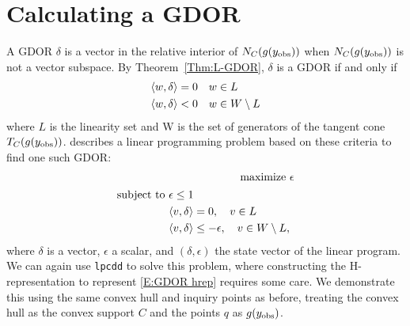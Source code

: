 \section{Calculating a GDOR} \label{S:GDOR calc}
A GDOR $\delta$ is a vector in the relative interior of $N_C(g(y_{\text{obs}}))$ when
$N_C(g(y_{\text{obs}}))$ is not a vector subspace.  
By Theorem~\ref{Thm:L-GDOR}, $\delta$ is a GDOR if and only if
\begin{align*}
	\langle w,\delta \rangle & = 0 	\quad w \in L\\
	\langle w,\delta \rangle & < 0 	\quad w \in W \setminus L
\end{align*}
where $L$ is the linearity set and W is the set of generators of 
the tangent cone $T_C(g(y_{\text{obs}}))$.
\citet{Geyer:gdor} describes a linear programming problem based on these
criteria to find one such GDOR:
\begin{align}
	\text{maximize } 	&\epsilon \label{E:GDOR objv} \\ 
	\begin{split}
	\text{subject to } 	&\epsilon \leq 1 \label{E:GDOR hrep}\\
	&\langle v,\delta \rangle = 0, \quad v \in L \\
	&\langle v,\delta \rangle \leq -\epsilon, \quad v \in W \setminus L,
	\end{split}
\end{align}
where $\delta$ is a vector, $\epsilon$ a scalar, and $(\delta, \epsilon)$ the state
vector of the linear program.  We can again use \texttt{lpcdd} to solve this 
problem, where constructing the H-representation to represent \eqref{E:GDOR hrep}
requires some care.  We demonstrate this using the same convex hull and inquiry points as 
before, treating the convex hull as the convex support $C$ and 
the points $q$ as $g(y_{\text{obs}})$.
